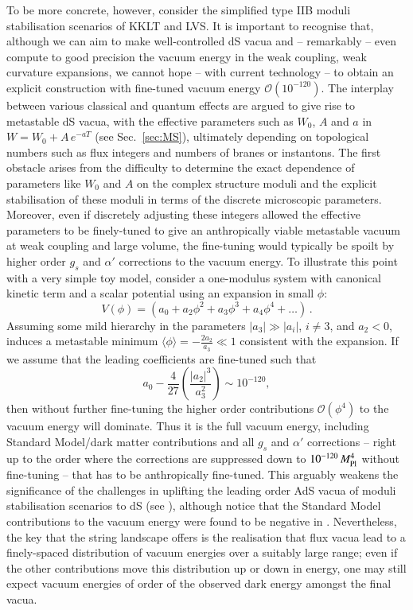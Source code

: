 To be more concrete, however, consider the simplified type IIB moduli stabilisation scenarios of KKLT and LVS. It is important to recognise that, although we can aim to make well-controlled dS vacua and -- remarkably -- even compute to good precision the vacuum energy in the weak coupling, weak curvature expansions, we cannot hope -- with current technology -- to obtain an explicit construction with fine-tuned vacuum energy $\mathcal{O}(10^{-120})$. The interplay between various classical and quantum effects are argued to give rise to metastable dS vacua, with the effective parameters such as $W_0$, $A$ and $a$ in $W =W_0+ A \, e^{-aT}$ (see Sec.~\ref{sec:MS}), ultimately depending on topological numbers such as flux integers and numbers of branes or instantons. The first obstacle arises from the difficulty to determine the exact dependence of parameters like $W_0$ and $A$ on the complex structure moduli and the explicit stabilisation of these moduli in terms of the discrete microscopic parameters. Moreover, even if discretely adjusting these integers allowed the effective parameters to be finely-tuned to give an anthropically viable metastable vacuum at weak coupling and large volume, the fine-tuning would typically be spoilt by higher order $g_s$ and $\alpha'$ corrections to the vacuum energy. To illustrate this point with a very simple toy model, consider a one-modulus system with canonical kinetic term and a scalar potential using an expansion in small $\phi$:
\begin{equation}
V(\phi) = \left(a_0 + a_2 \phi^2 + a_3 \phi^3 + a_4 \phi^4 + \dots\right)  \,.
\end{equation}
Assuming some mild hierarchy in the parameters $|a_3| \gg |a_i|$, $i\neq 3$, and $a_2 <0$, induces a metastable minimum $\langle \phi \rangle = -\frac{2 a_2}{a_3} \ll 1$ consistent with the expansion. If we assume that the leading coefficients are fine-tuned such that 
$$a_0-\frac{4}{27}\left(\frac{|a_2|^3}{a_3^2} \right) \sim 10^{-120},$$ 
then without further fine-tuning the higher order contributions $\mathcal{O}\left( \phi^4 \right)$ to the vacuum energy will dominate. Thus it is the full vacuum energy, including Standard Model/dark matter contributions and all $g_s$ and $\alpha'$ corrections -- right up to the order where the corrections are suppressed down to $10^{-120}\,M_{\rm Pl}^4$ without fine-tuning --  that has to be anthropically fine-tuned. This arguably weakens the significance of the challenges in uplifting the leading order AdS vacua of moduli stabilisation scenarios to dS (see \cite{deAlwis:2021zab}), although notice that the Standard Model contributions to the vacuum energy were found to be negative in \cite{Koksma:2011cq,Martin:2012bt}. Nevertheless, the key that the string landscape offers is the realisation that flux vacua lead to a finely-spaced distribution of vacuum energies over a suitably large range; even if the other contributions move this distribution up or down in energy, one may still expect vacuum energies of order of the observed dark energy amongst the final vacua.


